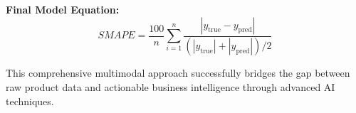 \documentclass[10pt,a4paper]{article}
\begin{document}
\vspace{0.5cm}

\textbf{Final Model Equation:}
\begin{equation}
SMAPE = \frac{100}{n} \sum_{i=1}^{n} \frac{|y_{\text{true}} - y_{\text{pred}}|}{(|y_{\text{true}}| + |y_{\text{pred}}|)/2}
\end{equation}

This comprehensive multimodal approach successfully bridges the gap between raw product data and actionable business intelligence through advanced AI techniques.
\end{document}
